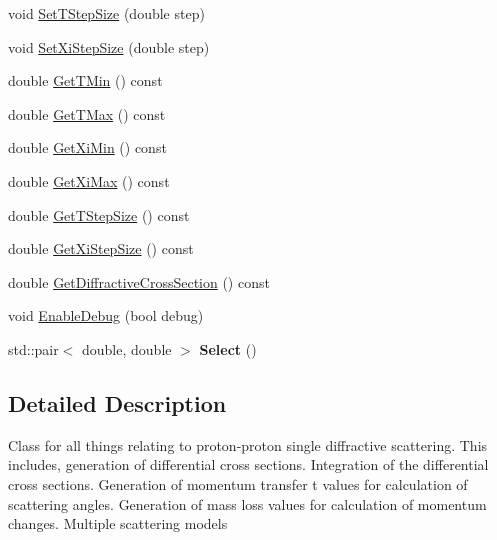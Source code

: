 \begin{DoxyCompactItemize}
void \hyperlink{classParticleTracking_1_1ppDiffractiveScatter_a19f9d33319193a4dab8e50c48fd72d7a}{Set\+T\+Step\+Size} (double step)
\item 
void \hyperlink{classParticleTracking_1_1ppDiffractiveScatter_af1e7bef526bd62823d1cdc5e9346ac1f}{Set\+Xi\+Step\+Size} (double step)
\item 
double \hyperlink{classParticleTracking_1_1ppDiffractiveScatter_a8d902c13f5e4ad344a70838dbf88549f}{Get\+T\+Min} () const
\item 
double \hyperlink{classParticleTracking_1_1ppDiffractiveScatter_a59b5664ec798af2b1cc682240c477523}{Get\+T\+Max} () const
\item 
double \hyperlink{classParticleTracking_1_1ppDiffractiveScatter_a3f2bea86667f9eef5afad654eef91d21}{Get\+Xi\+Min} () const
\item 
double \hyperlink{classParticleTracking_1_1ppDiffractiveScatter_a0f05fe9418d9081c40fb89ae0274fc56}{Get\+Xi\+Max} () const
\item 
double \hyperlink{classParticleTracking_1_1ppDiffractiveScatter_a552947ba20fbbf8e93cbc48b3e9e6a5f}{Get\+T\+Step\+Size} () const
\item 
double \hyperlink{classParticleTracking_1_1ppDiffractiveScatter_a7b00f2c992d0e353c85c6ee4b0e6cbda}{Get\+Xi\+Step\+Size} () const
\item 
double \hyperlink{classParticleTracking_1_1ppDiffractiveScatter_a89425dbbdcf14f06ffe2bf50cfde7072}{Get\+Diffractive\+Cross\+Section} () const
\item 
void \hyperlink{classParticleTracking_1_1ppDiffractiveScatter_a206970eeedffc495ff7558fd5078b2a0}{Enable\+Debug} (bool debug)
\item 
\mbox{\label{classParticleTracking_1_1ppDiffractiveScatter_a813e2437d113d3db8994e3301d07855e}} 
std\+::pair$<$ double, double $>$ {\bfseries Select} ()
\end{DoxyCompactItemize}


\subsection{Detailed Description}
Class for all things relating to proton-\/proton single diffractive scattering. This includes, generation of differential cross sections. Integration of the differential cross sections. Generation of momentum transfer t values for calculation of scattering angles. Generation of mass loss values for calculation of momentum changes. Multiple scattering models 

